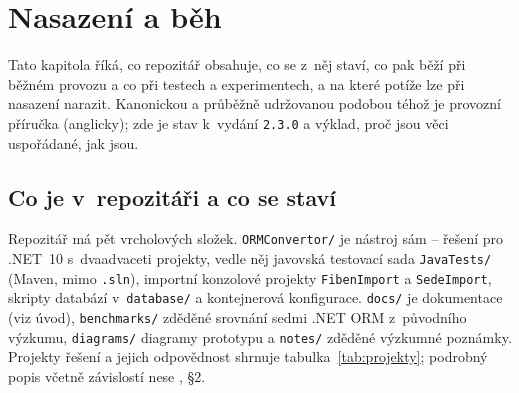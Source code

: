 \documentclass{article}
\begin{document}
\section{Nasazení a běh}\label{sec:nasazeni}

Tato kapitola říká, co repozitář obsahuje, co se z~něj staví, co pak běží při běžném provozu a co při testech a experimentech, a na které potíže lze při nasazení narazit. Kanonickou a průběžně udržovanou podobou téhož je provozní příručka  (anglicky); zde je stav k~vydání \texttt{2.3.0} a výklad, proč jsou věci uspořádané, jak jsou.

\subsection{Co je v~repozitáři a co se staví}

Repozitář má pět vrcholových složek. \texttt{ORMConvertor/} je nástroj sám -- řešení pro .NET~10 s~dvaadvaceti projekty, vedle něj javovská testovací sada \texttt{JavaTests/} (Maven, mimo \texttt{.sln}), importní konzolové projekty \texttt{FibenImport} a \texttt{SedeImport}, skripty databází v~\texttt{database/} a kontejnerová konfigurace. \texttt{docs/} je dokumentace (viz úvod), \texttt{benchmarks/} zděděné srovnání sedmi .NET ORM z~původního výzkumu, \texttt{diagrams/} diagramy prototypu a \texttt{notes/} zděděné výzkumné poznámky. Projekty řešení a jejich odpovědnost shrnuje tabulka~\ref{tab:projekty}; podrobný popis včetně závislostí nese , §2.
\end{document}
